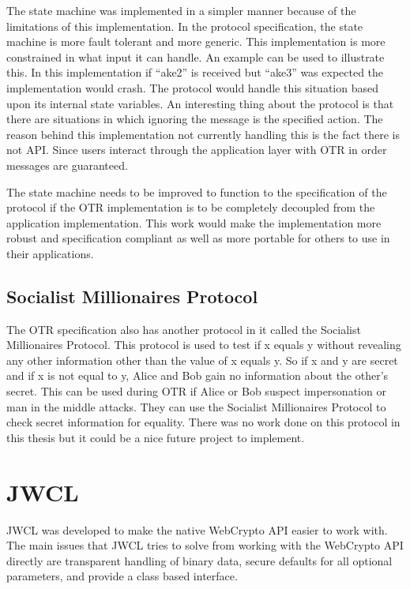 The state machine was implemented in a simpler manner because of the limitations of this implementation. In the protocol specification, the state machine is more fault tolerant and more generic. This implementation is more constrained in what input it can handle. An example can be used to illustrate this. In this implementation if “ake2” is received but “ake3” was expected the implementation would crash. The protocol would handle this situation based upon its internal state variables. An interesting thing about the protocol is that there are situations in which ignoring the message is the specified action. The reason behind this implementation not currently handling this is the fact there is not API. Since users interact through the application layer with OTR in order messages are guaranteed.


The state machine needs to be improved to function to the specification of the protocol if the OTR implementation is to be completely decoupled from the application implementation. This work would make the implementation more robust and specification compliant as well as more portable for others to use in their applications.


\subsection{Socialist Millionaires Protocol}


The OTR specification also has another protocol in it called the Socialist Millionaires Protocol. This protocol is used to test if x equals y without revealing any other information other than the value of x equals y. So if x and y are secret and if x is not equal to y, Alice and Bob gain no information about the other’s secret. This can be used during OTR if Alice or Bob suspect impersonation or man in the middle attacks. They can use the Socialist Millionaires Protocol to check secret information for equality. There was no work done on this protocol in this thesis but it could be a nice future project to implement.


\section{JWCL}


JWCL was developed to make the native WebCrypto API easier to work with. The main issues that JWCL tries to solve from working with the WebCrypto API directly are transparent handling of binary data, secure defaults for all optional parameters, and provide a class based interface.


